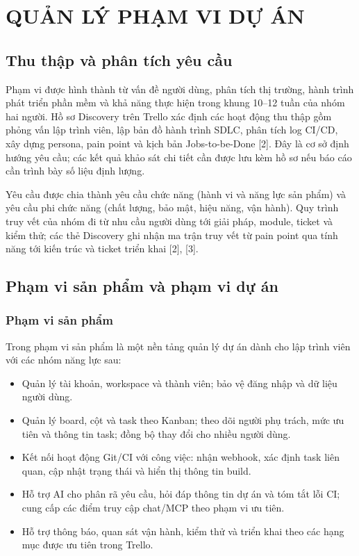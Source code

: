 \documentclass[12pt,a4paper]{report}
\begin{document}
\chapter{QUẢN LÝ PHẠM VI DỰ ÁN}
\section{Thu thập và phân tích yêu cầu}
Phạm vi được hình thành từ vấn đề người dùng, phân tích thị trường, hành trình phát triển phần mềm và khả năng thực hiện trong khung 10–12 tuần của nhóm hai người. Hồ sơ Discovery trên Trello xác định các hoạt động thu thập gồm phỏng vấn lập trình viên, lập bản đồ hành trình SDLC, phân tích log CI/CD, xây dựng persona, pain point và kịch bản Jobs-to-be-Done [2]. Đây là cơ sở định hướng yêu cầu; các kết quả khảo sát chi tiết cần được lưu kèm hồ sơ nếu báo cáo cần trình bày số liệu định lượng.

Yêu cầu được chia thành yêu cầu chức năng (hành vi và năng lực sản phẩm) và yêu cầu phi chức năng (chất lượng, bảo mật, hiệu năng, vận hành). Quy trình truy vết của nhóm đi từ nhu cầu người dùng tới giải pháp, module, ticket và kiểm thử; các thẻ Discovery ghi nhận ma trận truy vết từ pain point qua tính năng tới kiến trúc và ticket triển khai [2], [3].

\section{Phạm vi sản phẩm và phạm vi dự án}
\subsection{Phạm vi sản phẩm}
Trong phạm vi sản phẩm là một nền tảng quản lý dự án dành cho lập trình viên với các nhóm năng lực sau:
\begin{itemize}
    \item Quản lý tài khoản, workspace và thành viên; bảo vệ đăng nhập và dữ liệu người dùng.
    \item Quản lý board, cột và task theo Kanban; theo dõi người phụ trách, mức ưu tiên và thông tin task; đồng bộ thay đổi cho nhiều người dùng.
    \item Kết nối hoạt động Git/CI với công việc: nhận webhook, xác định task liên quan, cập nhật trạng thái và hiển thị thông tin build.
    \item Hỗ trợ AI cho phân rã yêu cầu, hỏi đáp thông tin dự án và tóm tắt lỗi CI; cung cấp các điểm truy cập chat/MCP theo phạm vi ưu tiên.
    \item Hỗ trợ thông báo, quan sát vận hành, kiểm thử và triển khai theo các hạng mục được ưu tiên trong Trello.
\end{itemize}
\end{document}
